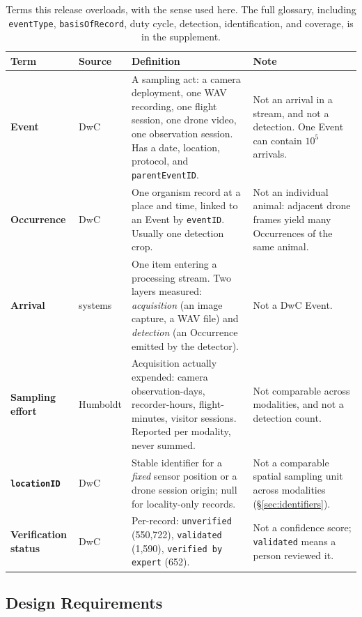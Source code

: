 \documentclass[sigconf]{acmart}
\begin{document}
\begin{table}[t]
\caption{Terms this release overloads, with the sense used here. The
full glossary, including \texttt{eventType}, \texttt{basisOfRecord},
duty cycle, detection, identification, and coverage, is in the
supplement.}
\label{tab:glossary}
\footnotesize
\begin{tabular}{p{}p{}p{}p{}}
\toprule
\textbf{Term} & \textbf{Source} & \textbf{Definition} & \textbf{Note} \\
\midrule
\textbf{Event} & DwC & A sampling act: a camera deployment, one WAV recording, one flight session, one drone video, one observation session. Has a date, location, protocol, and \texttt{parentEventID}. & Not an arrival in a stream, and not a detection. One Event can contain $10^5$ arrivals. \\
\textbf{Occurrence} & DwC & One organism record at a place and time, linked to an Event by \texttt{eventID}. Usually one detection crop. & Not an individual animal: adjacent drone frames yield many Occurrences of the same animal. \\
\textbf{Arrival} & systems & One item entering a processing stream. Two layers measured: \emph{acquisition} (an image capture, a WAV file) and \emph{detection} (an Occurrence emitted by the detector). & Not a DwC Event. \\
\textbf{Sampling effort} & Humboldt & Acquisition actually expended: camera observation-days, recorder-hours, flight-minutes, visitor sessions. Reported per modality, never summed. & Not comparable across modalities, and not a detection count. \\
\textbf{\texttt{locationID}} & DwC & Stable identifier for a \emph{fixed} sensor position or a drone session origin; null for locality-only records. & Not a comparable spatial sampling unit across modalities (\S\ref{sec:identifiers}). \\
\textbf{Verification status} & DwC & Per-record: \texttt{unverified} (550{,}722), \texttt{validated} (1{,}590), \texttt{verified by expert} (652). & Not a confidence score; \texttt{validated} means a person reviewed it. \\
\bottomrule
\end{tabular}
\end{table}

\subsection{Design Requirements}
\end{document}
